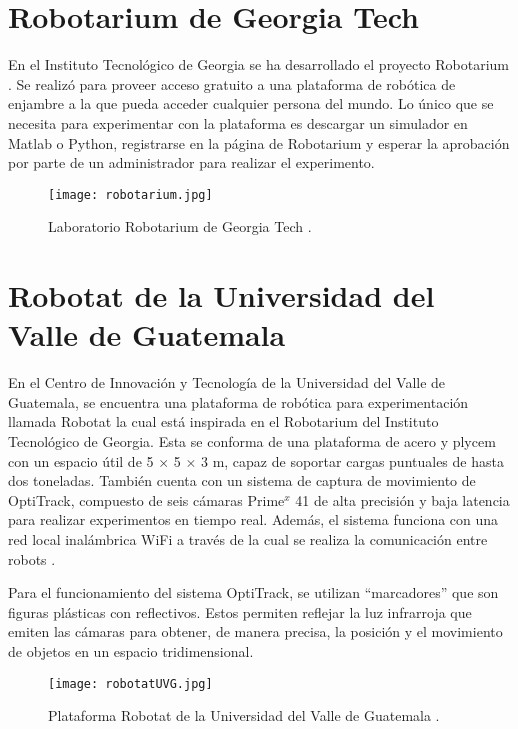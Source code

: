 \section{Robotarium de Georgia Tech}
En el Instituto Tecnológico de Georgia se ha desarrollado el proyecto Robotarium \cite{Robotarium}. Se realizó para proveer acceso gratuito a una plataforma de robótica de enjambre a la que pueda acceder cualquier persona del mundo. Lo único que se necesita para experimentar con la plataforma es descargar un simulador en Matlab o Python, registrarse en la página de Robotarium y esperar la aprobación por parte de un administrador para realizar el experimento.

\begin{figure}[H]
	\centering
	\texttt{[image: robotarium.jpg]}
	\caption{Laboratorio Robotarium de Georgia Tech \cite{Robotarium}.}
	\label{fig:robotarium}
\end{figure}

\section{Robotat de la Universidad del Valle de Guatemala}
En el Centro de Innovación y Tecnología de la Universidad del Valle de Guatemala, se encuentra una plataforma de robótica para experimentación llamada Robotat la cual está inspirada en el Robotarium del Instituto Tecnológico de Georgia. Esta se conforma de una plataforma de acero y plycem con un espacio útil de 5 $\times$ 5 $\times$ 3 m, capaz de soportar cargas puntuales de hasta dos toneladas. También cuenta con un sistema de captura de movimiento de OptiTrack, compuesto de seis cámaras Prime$^x$ 41 de alta precisión y baja latencia para realizar experimentos en tiempo real. Además, el sistema funciona con una red local inalámbrica WiFi a través de la cual se realiza la comunicación entre robots \cite{Robotat}. 

Para el funcionamiento del sistema OptiTrack, se utilizan ``marcadores'' que son figuras plásticas con reflectivos. Estos permiten reflejar la luz infrarroja que emiten las cámaras para obtener, de manera precisa, la posición y el movimiento de objetos en un espacio tridimensional.

\begin{figure}[H]
	\centering
	\texttt{[image: robotatUVG.jpg]}
	\caption{Plataforma Robotat de la Universidad del Valle de Guatemala \cite{imgRobotat}.}
	\label{fig:robotat}
\end{figure}


